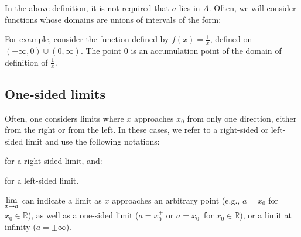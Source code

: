 \documentclass{article}
\begin{document}
In the above definition, it is not required that $a$ lies in $A$.
Often, we will consider functions whose domains are unions of
intervals of the form:


For example, consider the function defined by $f(x) = \frac{1}{x}$, defined
on $(-\infty, 0) \cup (0, \infty)$. The point $0$ is an accumulation point of
the domain of definition of $\frac{1}{x}$.


\subsection{One-sided limits}
Often, one considers limits where $x$ approaches $x_0$ from only one
direction, either from the right or from the left. In these cases,
we refer to a right-sided or left-sided limit and use the following
notations:


for a right-sided limit, and:


for a left-sided limit.

$\displaystyle \lim_{x \to a}$ can indicate a limit as $x$ approaches an
arbitrary point (e.g., $a = x_0$ for $x_0 \in \mathbb{R}$), as well
as a one-sided limit ($a = x_0^+$ or $a = x_0^-$ for $x_0 \in \mathbb{R}$),
or a limit at infinity ($a = \pm \infty$).
\end{document}
